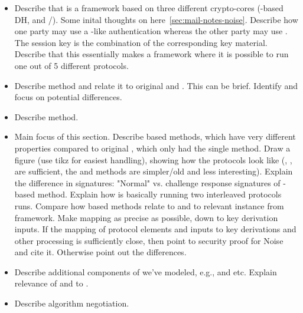 \documentclass[runningheads]{llncs}
\begin{document}
{\begin{itemize}
\begin{itemize}
                establishment for \mEdhoc.
            \item Describe that \mEdhoc is a framework based on three different
                crypto-cores (\mPsk-based DH, \mSigma and \mOptls/\mNoise).
                Some inital thoughts on \mNoise here~\ref{sec:mail-notes-noise}.
                Describe how one party may use a \mSigma-like authentication
                whereas the other party may use \mOptls. The session key is
                the combination of the corresponding key material.
                Describe that this essentially makes
                \mEdhoc a framework where it is possible to run one out of 5
                different protocols.
            \item Describe \mSigSig method and relate it to original \mEdhoc and
                \mSigma. This can be brief. Identify and focus on potential
                differences.
            \item Describe \mPskPsk method.
            \item Main focus of this section. Describe \mStat based methods, which
                  have very different properties compared to original \mEdhoc,
                  which only had the single \mSigma method.
                  Draw a figure (use tikz for easiest handling), showing how the
                  protocols look like (\mStatStat, \mStatSig, \mSigStat are
                  sufficient, the \mPsk and \mSigSig methods are simpler/old and
                  less interesting).
                  Explain the difference in signatures: "Normal" vs. challenge
                  response signatures of \mStat-based method.
                  Explain how \mStatStat is basically running two interleaved
                  \mOptls protocols runs. Compare how \mStat based methods relate
                  to \mOptls and to relevant instance from \mNoise framework.
                  Make mapping as precise as possible, down to key derivation
                  inputs. If the mapping of protocol elements and inputs to
                  key derivations and other processing is sufficiently close,
                  then point to security proof for Noise and cite it. Otherwise
                  point out the differences.
             \item Describe additional components of \mEdhoc we've modeled,
                  e.g., \mCi and \mCr etc.
                  Explain relevance of \mCi and \mCr to \mOscore.
             \item Describe algorithm negotiation.

\end{itemize}
\end{itemize}}
\end{document}
